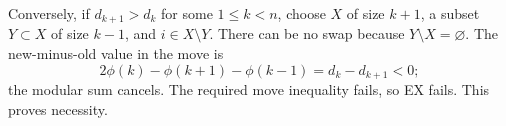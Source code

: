 \documentclass[11pt]{article}
\theoremstyle{definition}
\theoremstyle{remark}
\numberwithin{equation}{section}
\begin{document}
Conversely, if $d_{k+1}>d_k$ for some $1\le k<n$, choose $X$ of size $k+1$, a subset $Y\subset X$ of size $k-1$, and $i\in X\setminus Y$. There can be no swap because $Y\setminus X=\varnothing$. The new-minus-old value in the move is
\[
2\phi(k)-\phi(k+1)-\phi(k-1)=d_k-d_{k+1}<0;
\]
the modular sum cancels. The required move inequality fails, so EX fails. This proves necessity.



\end{document}

